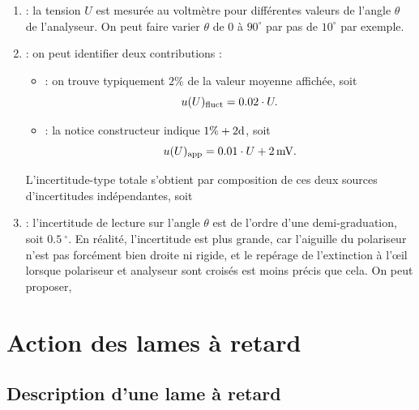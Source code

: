 \begin{quest}
{  \begin{enumerate}
    \item {} : la tension $U$ est mesurée au voltmètre pour différentes valeurs de l'angle $\theta$ de l'analyseur. On peut faire varier $\theta$ de $0$ à $90^\circ$ par pas de $10^\circ$ par exemple.
    \item {} : on peut identifier deux contributions :
      \begin{itemize}
        \item {} : on trouve typiquement  $2\%$ de la valeur moyenne affichée, soit
        $$
      u(U)_{\rm{fluct}} = \num{0.02} \cdot U.
        $$
        \item {} : la notice constructeur indique $1\% + 2{\rm d}$, soit 
        $$
        u(U)_{\rm{app}} = \num{0.01} \cdot U + \SI{2}{mV}.
        $$
      \end{itemize}L'incertitude-type totale 
      s'obtient par composition de ces deux sources d'incertitudes indépendantes, soit
      \item {} : l'incertitude de lecture sur l'angle $\theta$ est de l'ordre d'une demi-graduation, soit $\SI{0.5}{^\circ}$. En réalité, l'incertitude est plus grande, car l'aiguille du polariseur n'est pas forcément bien droite ni rigide, et le repérage de l'extinction à l'œil lorsque polariseur et analyseur sont croisés est moins précis que cela. On peut proposer,
  \end{enumerate}
}
\end{quest}

\section{Action des lames à retard}


\subsection{Description d'une lame à retard}

